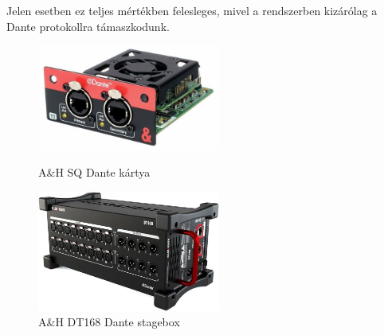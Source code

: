Jelen esetben ez teljes mértékben felesleges, mivel a rendszerben kizárólag a Dante protokollra támaszkodunk.
\begin{figure}[H]
    \centering
    \begin{minipage}{0.45\textwidth}
        \centering
        \includegraphics[width=60mm, keepaspectratio]{figures/sq_dante.jpg}
        \caption{A\&H SQ Dante kártya}\label{fig:sq_dante}
    \end{minipage}\hfill
    \begin{minipage}{0.45\textwidth}
        \centering
        \includegraphics[width=60mm, keepaspectratio]{figures/dt168.jpg}
        \caption{A\&H DT168 Dante stagebox}\label{fig:dt168}
    \end{minipage}
\end{figure}

